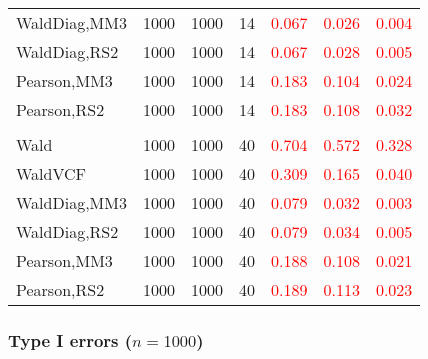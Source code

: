 \documentclass[
]{article}
\begin{document}
\begin{table}[H]
{\begin{tabular}[t]{lrrrrrr}
\hspace{1em}WaldDiag,MM3 & 1000 & 1000 & 14 & \textcolor{red}{0.067} & \textcolor{red}{0.026} & \textcolor{red}{0.004}\\
\hspace{1em}WaldDiag,RS2 & 1000 & 1000 & 14 & \textcolor{red}{0.067} & \textcolor{red}{0.028} & \textcolor{red}{0.005}\\
\hspace{1em}Pearson,MM3 & 1000 & 1000 & 14 & \textcolor{red}{0.183} & \textcolor{red}{0.104} & \textcolor{red}{0.024}\\
\hspace{1em}Pearson,RS2 & 1000 & 1000 & 14 & \textcolor{red}{0.183} & \textcolor{red}{0.108} & \textcolor{red}{0.032}\\
\addlinespace[0.3em]
\multicolumn{7}{l}{\textbf{3F 15V}}\\
\hspace{1em}Wald & 1000 & 1000 & 40 & \textcolor{red}{0.704} & \textcolor{red}{0.572} & \textcolor{red}{0.328}\\
\hspace{1em}WaldVCF & 1000 & 1000 & 40 & \textcolor{red}{0.309} & \textcolor{red}{0.165} & \textcolor{red}{0.040}\\
\hspace{1em}WaldDiag,MM3 & 1000 & 1000 & 40 & \textcolor{red}{0.079} & \textcolor{red}{0.032} & \textcolor{red}{0.003}\\
\hspace{1em}WaldDiag,RS2 & 1000 & 1000 & 40 & \textcolor{red}{0.079} & \textcolor{red}{0.034} & \textcolor{red}{0.005}\\
\hspace{1em}Pearson,MM3 & 1000 & 1000 & 40 & \textcolor{red}{0.188} & \textcolor{red}{0.108} & \textcolor{red}{0.021}\\
\hspace{1em}Pearson,RS2 & 1000 & 1000 & 40 & \textcolor{red}{0.189} & \textcolor{red}{0.113} & \textcolor{red}{0.023}\\
\bottomrule
\end{tabular}}
\endgroup{}
\end{table}

\hypertarget{type-i-errors-n1000-1}{%
\subsubsection{\texorpdfstring{Type I errors
(\(n=1000\))}{Type I errors (n=1000)}}\label{type-i-errors-n1000-1}}
\end{document}
